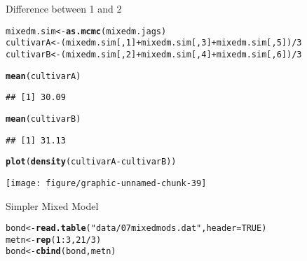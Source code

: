 \documentclass[12pt,letterpaper,oneside]{article}\usepackage{graphicx, color}
\makeatletter
\newcommand{\hlfunctioncall}[1]{\textcolor[rgb]{0.501960784313725,0,0.329411764705882}{\textbf{#1}}}%
\newcommand{\hlstring}[1]{\textcolor[rgb]{0.6,0.6,1}{#1}}%
\newenvironment{kframe}{%
 \def\at@end@of@kframe{}%
 \ifinner\ifhmode%
  \def\at@end@of@kframe{\end{minipage}}%
  \begin{minipage}{\columnwidth}%
 \fi\fi%
 \def\FrameCommand##1{\hskip\@totalleftmargin \hskip-\fboxsep
 \colorbox{shadecolor}{##1}\hskip-\fboxsep
     \hskip-\linewidth \hskip-\@totalleftmargin \hskip\columnwidth}%
 \MakeFramed {\advance\hsize-\width
   \@totalleftmargin\z@ \linewidth\hsize
   \@setminipage}}%
 {\par\unskip\endMakeFramed%
 \at@end@of@kframe}
\newenvironment{knitrout}{}{} %
\newcommand{\dateTaken}{January 7, 2013}
\makeatother
\begin{document}
Difference between 1 and 2
\begin{knitrout}\scriptsize
{}\color{fgcolor}\begin{kframe}
\begin{alltt}
mixedm.sim <- \hlfunctioncall{as.mcmc}(mixedm.jags)
cultivarA <- (mixedm.sim[, 1] + mixedm.sim[, 3] + mixedm.sim[, 5])/3
cultivarB <- (mixedm.sim[, 2] + mixedm.sim[, 4] + mixedm.sim[, 6])/3

\hlfunctioncall{mean}(cultivarA)
\end{alltt}
\begin{verbatim}
## [1] 30.09
\end{verbatim}
\begin{alltt}
\hlfunctioncall{mean}(cultivarB)
\end{alltt}
\begin{verbatim}
## [1] 31.13
\end{verbatim}
\begin{alltt}
\hlfunctioncall{plot}(\hlfunctioncall{density}(cultivarA - cultivarB))
\end{alltt}
\end{kframe}

{\centering \texttt{[image: figure/graphic-unnamed-chunk-39]} 

}



\end{knitrout}

\renewcommand{\dateTaken}{February 28, 2013}
\daysep
Simpler Mixed Model
\begin{knitrout}\scriptsize
{}\color{fgcolor}\begin{kframe}
\begin{alltt}
bond <- \hlfunctioncall{read.table}(\hlstring{"data/07mixedmods.dat"}, header = TRUE)
metn <- \hlfunctioncall{rep}(1:3, 21/3)
bond <- \hlfunctioncall{cbind}(bond, metn)
\end{alltt}
\end{kframe}
\end{knitrout}
\end{document}

